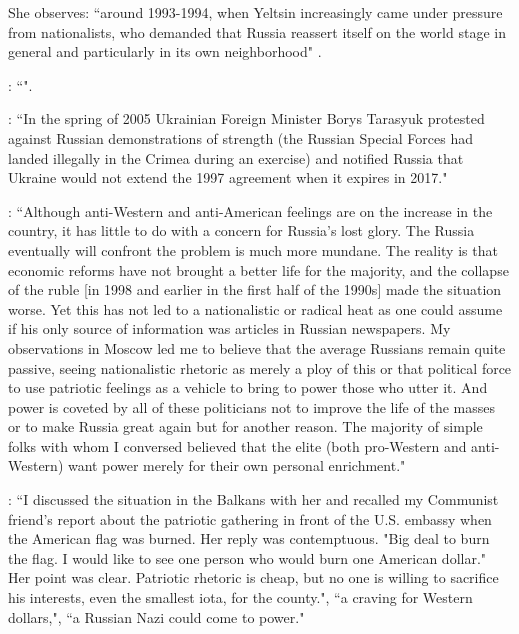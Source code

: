 She observes: ``around 1993-1994, when Yeltsin increasingly came under pressure from nationalists, who demanded that Russia reassert itself on the world stage in general and particularly in its own neighborhood" \citep[p.~125]{hancock2009}. 

\citep{dunlop1997}: ``".

\citep[p.~61]{lachowski2007}: ``In the spring of 2005 Ukrainian Foreign Minister Borys Tarasyuk protested against Russian demonstrations of strength (the Russian Special Forces had landed 
illegally in the Crimea during an exercise) and notified Russia that Ukraine would 
not extend the 1997 agreement when it expires in 2017."

\citep{shlapentokh2000}: ``Although anti-Western and anti-American feelings are on the increase
in the country, it has little to do with a concern for Russia's lost glory. The
Russia eventually will confront the problem is much more mundane. The reality is that economic reforms have not brought a better life for the majority, and the collapse of the ruble [in 1998 and earlier in the first half of the 1990s] made the situation worse. Yet this has not led to a nationalistic or radical heat as one could assume
if his only source of information was articles in Russian newspapers. My observations in Moscow led me to believe that the average Russians remain quite passive, seeing nationalistic rhetoric as merely a ploy of this or that political force to use patriotic feelings as a vehicle to bring to power those who utter it. And power is coveted by all of these politicians not to improve the life of the masses or to make Russia great again but for another reason. The majority of simple folks with whom I conversed believed that the elite
(both pro-Western and anti-Western) want power merely for their own personal enrichment."

\citep{shlapentokh2000}: ``I discussed the situation in the Balkans with her and recalled my
Communist friend's report about the patriotic gathering in front of the U.S. embassy when the American flag was burned. Her reply was contemptuous.
"Big deal to burn the flag. I would like to see
one person who would burn one American
dollar." Her point was clear. Patriotic rhetoric
is cheap, but no one is willing to sacrifice his
interests, even the smallest iota, for the
county.", ``a craving for Western dollars,", ``a Russian Nazi could come to power."

